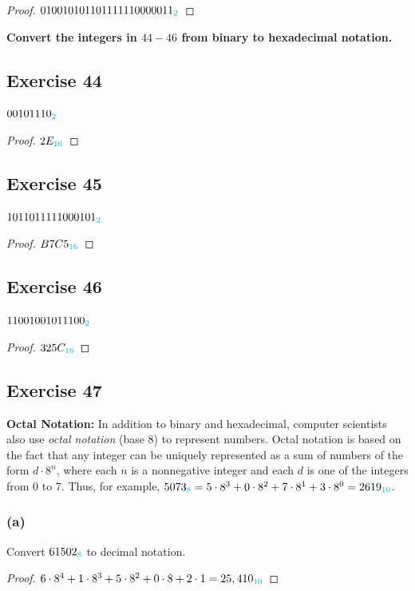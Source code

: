 \documentclass[14pt]{extarticle}
\newcommand{\base}[1]{{\color{cyan}#1}}
\begin{document}
\begin{proof} 
$010010101101111110000011_\base{2}$ 
\end{proof}

{\bf \color{cyan} Convert the integers in $44-46$ from binary to hexadecimal notation.}

\subsection{Exercise 44} 
$00101110_\base{2}$

\begin{proof} 
$2E_\base{16}$ 
\end{proof}

\subsection{Exercise 45} 
$1011011111000101_\base{2}$

\begin{proof} 
$B7C5_\base{16}$ 
\end{proof}

\subsection{Exercise 46} 
$11001001011100_\base{2}$

\begin{proof} 
$325C_\base{16}$ 
\end{proof}

\subsection{Exercise 47} 
{\bf Octal Notation:} In addition to binary and hexadecimal, computer scientists also use {\it octal notation} (base 8) to
represent numbers. Octal notation is based on the fact that any integer can be uniquely represented as a sum of numbers of the form $d \cdot 8^n$, where each $n$ is a nonnegative integer and each $d$ is one of the integers from 0 to 7. Thus, for example, $5073_\base{8} = 5 \cdot 8^3 + 0 \cdot 8^2 + 7 \cdot 8^1 + 3
\cdot 8^0 = 2619_\base{10}$.

\subsubsection{(a)} 
Convert $61502_\base{8}$ to decimal notation.

\begin{proof} 
$6\cdot8^4 + 1\cdot8^3 + 5\cdot8^2 + 0\cdot8 + 2\cdot1 = 25,410_\base{10}$ 
\end{proof}
\end{document}
